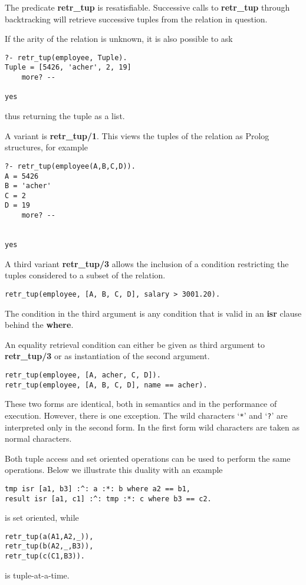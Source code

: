 The predicate {\bf retr\_\/tup} is resatisfiable. Successive calls 
to {\bf retr\_\/tup} through backtracking will retrieve successive tuples 
from the relation in question.

If the arity of the relation is unknown, it is also possible to ask
\begin{verbatim}
?- retr_tup(employee, Tuple).
Tuple = [5426, 'acher', 2, 19]
	more? -- 

yes
\end{verbatim}
thus returning the tuple as a list.


A variant is {\bf retr\_tup/1}. This views the tuples of the relation as 
Prolog structures, for example
\begin{verbatim}
?- retr_tup(employee(A,B,C,D)).
A = 5426
B = 'acher'
C = 2
D = 19
	more? -- 


yes
\end{verbatim}

A third variant {\bf retr\_tup/3} allows the inclusion
of a condition restricting the tuples considered to a 
subset of the relation. 
\begin{verbatim}
retr_tup(employee, [A, B, C, D], salary > 3001.20).
\end{verbatim}
The condition in the third argument is any condition that
is valid in an {\bf isr} clause behind the {\bf where}.

An equality retrieval condition can either be given as third argument
to {\bf retr\_tup/3} or as instantiation of the second argument.
\begin{verbatim}
retr_tup(employee, [A, acher, C, D]).
retr_tup(employee, [A, B, C, D], name == acher).
\end{verbatim}
These two forms are identical, both in semantics and in the performance
of execution. However, there is one exception. 
The wild characters `\verb-*-' and `\verb-?-' are interpreted only in
the second form. In the first form wild characters are taken as
normal characters.

Both tuple access and set oriented operations can be used to perform
the same operations. Below we illustrate this duality with an example
\begin{verbatim}
tmp isr [a1, b3] :^: a :*: b where a2 == b1,
result isr [a1, c1] :^: tmp :*: c where b3 == c2.
\end{verbatim}
is set oriented, while
\begin{verbatim}
retr_tup(a(A1,A2,_)), 
retr_tup(b(A2,_,B3)), 
retr_tup(c(C1,B3)).
\end{verbatim}
is tuple-at-a-time.

